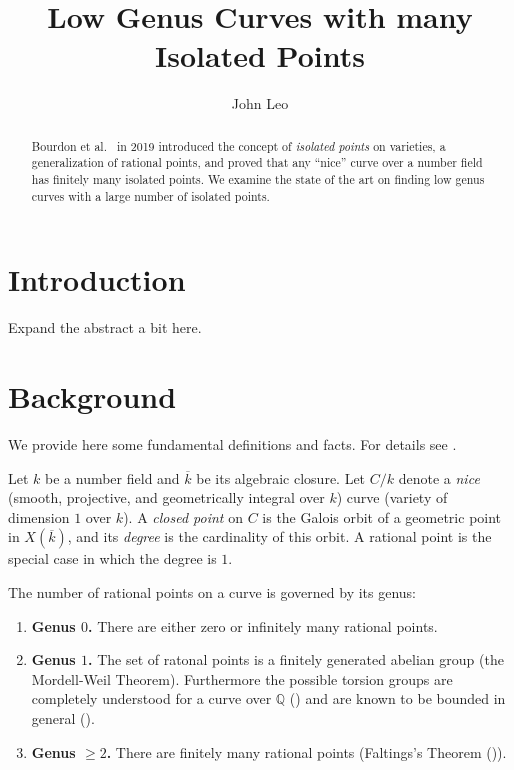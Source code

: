 \documentclass[12pt, reqno]{amsart}
\title{Low Genus Curves with many Isolated Points}
\author{John Leo}
\newcommand{\Q}{{\mathbb Q}}
\newcommand{\kbar}{{\overline{k}}}
\numberwithin{equation}{section}
\numberwithin{table}{section}
\begin{document}
\begin{abstract}
Bourdon et al.\ \cite{Bourdon2019} in 2019 introduced the concept of
\textit{isolated points} on varieties, a generalization of rational
points, and proved that any ``nice'' curve over a number field has
finitely many isolated points. We examine the state of the art on
finding low genus curves with a large number of isolated points.
\end{abstract}

\maketitle

\section{Introduction}

Expand the abstract a bit here.

\section{Background}

We provide here some fundamental definitions and facts. For details
see \cite{Viray2024}.

Let $k$ be a number field and $\kbar$ be its
algebraic closure. Let $C/k$ denote a \textit{nice} (smooth,
projective, and geometrically integral over $k$) curve (variety of
dimension $1$ over $k$). A \textit{closed point} on $C$ is the Galois
orbit of a geometric point in $X(\kbar)$, and its \textit{degree} is
the cardinality of this orbit. A rational point is the special case in
which the degree is $1$.

The number of rational points on a curve is governed by its genus:
\begin{enumerate}
  \item \textbf{Genus $0$.} There are either zero or infinitely many
    rational points.
  \item \textbf{Genus $1$.} The set of ratonal points is a finitely
    generated abelian group (the Mordell-Weil Theorem). Furthermore the possible
    torsion groups are completely understood for a curve over $\Q$
    (\cites{Mazur1977, Mazur1978}) and are known to be bounded in
    general (\cite{Merel1996}).
  \item \textbf{Genus $\ge 2$.} There are finitely many rational points
    (Faltings's Theorem (\cite{Faltings1983})).
\end{enumerate}
\end{document}
